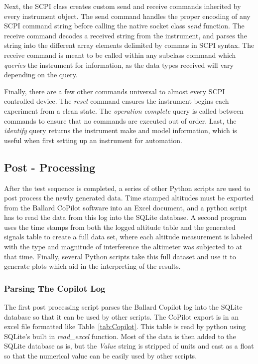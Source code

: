 Next, the SCPI class creates custom send and receive commands inherited by every instrument object. The send command handles the proper encoding of any SCPI command string before calling the native socket class \textit{send} function. The receive command decodes a received string from the instrument, and parses the string into the different array elements delimited by commas in SCPI syntax. The receive command is meant to be called within any subclass command which \textit{queries} the instrument for information, as the data types received will vary depending on the query. 

Finally, there are a few other commands universal to almost every SCPI controlled device. The \textit{reset} command ensures the instrument begins each experiment from a clean state. The \textit{operation complete} query is called between commands to ensure that no commands are executed out of order. Last, the \textit{identify} query returns the instrument make and model information, which is useful when first setting up an instrument for automation. 

\subsection{Post - Processing}
After the test sequence is completed, a series of other Python scripts are used to post process the newly generated data. Time stamped altitudes must be exported from the Ballard CoPilot software into an Excel document, and a python script has to read the data from this log into the SQLite database. A second program uses the time stamps from both the logged altitude table and the generated signals table to create a full data set, where each altitude measurement is labeled with the type and magnitude of interference the altimeter was subjected to at that time. Finally, several Python scripts take this full dataset and use it to generate plots which aid in the interpreting of the results. 
\subsubsection{Parsing The Copilot Log}
The first post processing script parses the Ballard Copilot log into the SQLite database so that it can be used by other scripts. The CoPilot export is in an excel file formatted like Table~\ref{tab:Copilot}. This table is read by python using SQLite's built in \textit{read\_excel} function. Most of the data is then added to the SQLite database as is, but the \textit{Value} string is stripped of units and cast as a float so that the numerical value can be easily used by other scripts. 

